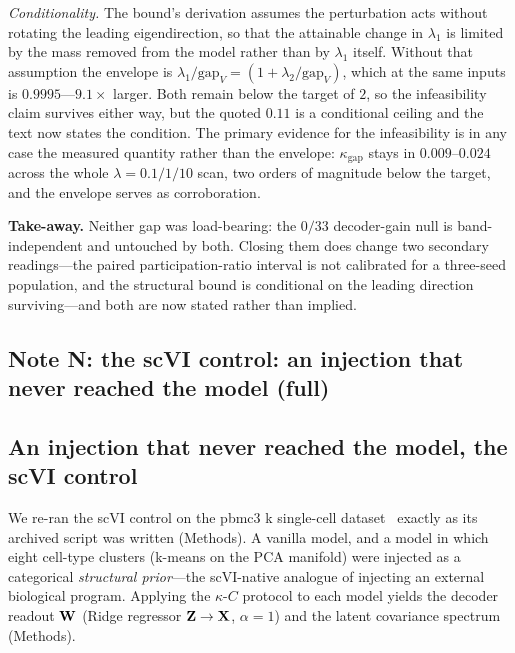 \documentclass[11 pt,a4 paper]{article}
\begin{document}
\emph{Conditionality.} The bound's derivation assumes the perturbation acts without rotating the leading eigendirection, so that the attainable change in $\lambda_1$ is limited by the mass removed from the model rather than by $\lambda_1$ itself. Without that assumption the envelope is $\lambda_1/\mathrm{gap}_V=(1+\lambda_2/\mathrm{gap}_V)$, which at the same inputs is $0.9995$---$9.1\times$ larger. Both remain below the target of $2$, so the infeasibility claim survives either way, but the quoted $0.11$ is a conditional ceiling and the text now states the condition. The primary evidence for the infeasibility is in any case the measured quantity rather than the envelope: $\kappa_{\mathrm{gap}}$ stays in $0.009$--$0.024$ across the whole $\lambda=0.1/1/10$ scan, two orders of magnitude below the target, and the envelope serves as corroboration.

\noindent\textbf{Take-away.} Neither gap was load-bearing: the $0/33$ decoder-gain null is band-independent and untouched by both. Closing them does change two secondary readings---the paired participation-ratio interval is not calibrated for a three-seed population, and the structural bound is conditional on the leading direction surviving---and both are now stated rather than implied.

\clearpage

\subsection*{Note N: the scVI control: an injection that never reached the model (full)}

\subsection*{An injection that never reached the model, the scVI control}
\label{sec:benchmark}

We re-ran the scVI control on the pbmc3 k single-cell dataset~\cite{zheng2017} exactly as its archived script was written (Methods). A vanilla model, and a model in which eight cell-type clusters (k-means on the PCA manifold) were injected as a categorical \emph{structural prior}---the scVI-native analogue of injecting an external biological program. Applying the $\kappa$-$C$ protocol to each model yields the decoder readout $\mathbf{W}$ (Ridge regressor $\mathbf{Z}\to\mathbf{X}$, $\alpha=1$) and the latent covariance spectrum (Methods).
\end{document}
